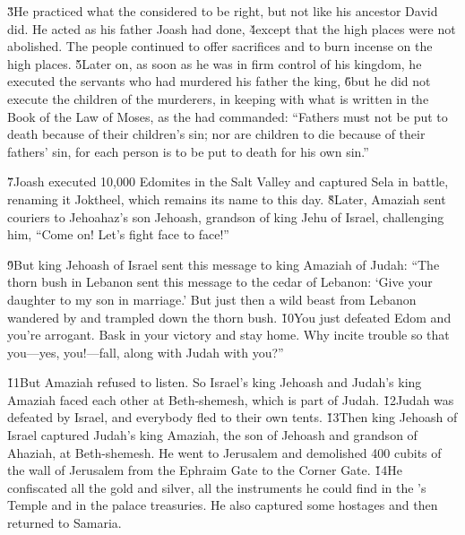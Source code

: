 \v{3}He practiced what the  considered to be right, but not like his ancestor David did. He acted as his father Joash had done, \v{4}except that the high places were not abolished. The people continued to offer sacrifices and to burn incense on the high places. \v{5}Later on, as soon as he was in firm control of his kingdom, he executed the servants who had murdered his father the king, \v{6}but he did not execute the children of the murderers, in keeping with what is written in the Book of the Law of Moses, as the  had commanded: ``Fathers must not be put to death because of their children's sin; nor are children to die because of their fathers' sin, for each person is to be put to death for his own sin.''

\v{7}Joash executed 10,000 Edomites in the Salt Valley and captured Sela in battle, renaming it Joktheel, which remains its name to this day. \v{8}Later, Amaziah sent couriers to Jehoahaz's son Jehoash, grandson of king Jehu of Israel, challenging him, ``Come on! Let's fight face to face!''

\v{9}But king Jehoash of Israel sent this message to king Amaziah of Judah: ``The thorn bush in Lebanon sent this message to the cedar of Lebanon: `Give your daughter to my son in marriage.' But just then a wild beast from Lebanon wandered by and trampled down the thorn bush. \v{10}You just defeated Edom and you're arrogant. Bask in your victory and stay home. Why incite trouble so that you---yes, you!---fall, along with Judah with you?''

\v{11}But Amaziah refused to listen. So Israel's king Jehoash and Judah's king Amaziah faced each other at Beth-shemesh, which is part of Judah. \v{12}Judah was defeated by Israel, and everybody fled to their own tents. \v{13}Then king Jehoash of Israel captured Judah's king Amaziah, the son of Jehoash and grandson of Ahaziah, at Beth-shemesh. He went to Jerusalem and demolished 400 cubits of the wall of Jerusalem from the Ephraim Gate to the Corner Gate. \v{14}He confiscated all the gold and silver, all the instruments he could find in the 's Temple and in the palace treasuries. He also captured some hostages and then returned to Samaria.

